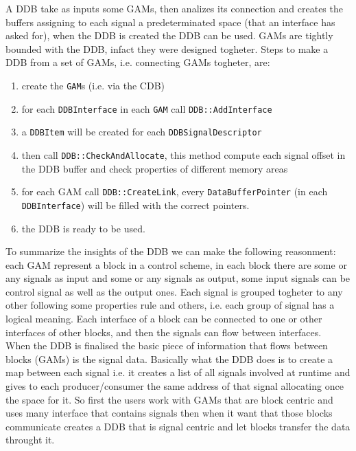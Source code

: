 A DDB take as inputs some GAMs, then analizes its connection and creates the buffers assigning to each signal a predeterminated space (that an interface has asked for), when the DDB is created the DDB can be used. GAMs are tightly bounded with the DDB, infact they were designed togheter.
Steps to make a DDB from a set of GAMs, i.e. connecting GAMs togheter, are:
\begin{enumerate}
 \item create the \texttt{GAM}s (i.e. via the CDB)
 \item for each \texttt{DDBInterface} in each \texttt{GAM} call \texttt{DDB::AddInterface}
 \item a \texttt{DDBItem} will be created for each \texttt{DDBSignalDescriptor}
 \item then call \texttt{DDB::CheckAndAllocate}, this method compute each signal offset in the DDB buffer and check properties of different memory areas
 \item for each GAM call \texttt{DDB::CreateLink}, every \texttt{DataBufferPointer} (in each \texttt{DDBInterface}) will be filled with the correct pointers.
 \item the DDB is ready to be used.
\end{enumerate}

To summarize the insights of the DDB we can make the following reasonment: each GAM represent a block in a control scheme, in each block there are some or any signals as input and some or any signals as output, some input signals can be control signal as well as the output ones. Each signal is grouped togheter to any other following some properties rule and others, i.e. each group of signal has a logical meaning. Each interface of a block can be connected to one or other interfaces of other blocks, and then the signals can flow between interfaces. \\

When the DDB is finalised the basic piece of information that flows between blocks (GAMs) is the signal data. Basically what the DDB does is to create a map between each signal i.e. it creates a list of all signals involved at runtime and gives to each producer/consumer the same address of that signal allocating once the space for it. So first the users work with GAMs that are block centric and uses many interface that contains signals then when it want that those blocks communicate creates a DDB that is signal centric and let blocks transfer the data throught it. \\


